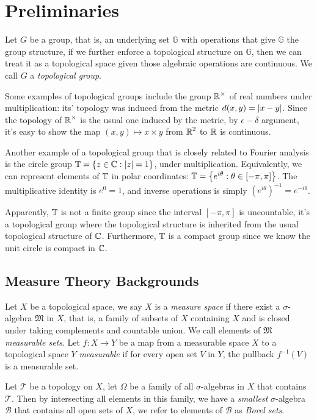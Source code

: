 \section{Preliminaries}

Let $G$ be a group, that is, an underlying set $\mathbb{G}$ with operations that
give $\mathbb{G}$ the group structure, if we further enforce a topological
structure on $\mathbb{G}$, then we can treat it as a topological space given
those algebraic operations are continuous. We call $G$ a \emph{topological group}.

Some examples of topological groups include the group $\operatorname{\mathbb{R}}^{\times}$ of real
numbers under multiplication: its' topology was induced from the metric $d(x,y)
= \left|x - y\right|$.  Since the topology of $\operatorname{\mathbb{R}}^{\times}$ is the usual one induced by
the metric, by $\epsilon-\delta$ argument, it's easy to show the map $(x,y)
\mapsto x \times y$ from $\operatorname{\mathbb{R}}^2$ to $\operatorname{\mathbb{R}}$ is continuous.

Another example of a topological group that is closely related to Fourier
analysis is the circle group $\operatorname{\mathbb{T}} = \left\{ z \in \operatorname{\mathbb{C}} : \left|z\right| = 1 \right\}$, under
multiplication.  Equivalently, we can represent elements of $\operatorname{\mathbb{T}}$ in polar
coordinates: $\operatorname{\mathbb{T}} = \left\{ e^{i\theta} : \theta \in [-\pi,\pi] \right\}$.  The
multiplicative identity is $e^{0} = 1$, and inverse operations is simply
$\left(e^{i\theta} \right)^{-1} = e^{-i\theta}$.

Apparently, $\operatorname{\mathbb{T}}$ is not a finite group since the interval $[-\pi, \pi]$ is
uncountable, it's a topological group where the topological structure is
inherited from the usual topological structure of $\operatorname{\mathbb{C}}$. Furthermore, $\operatorname{\mathbb{T}}$ is a
compact group since we know the unit circle is compact in $\operatorname{\mathbb{C}}$.

\subsection{Measure Theory Backgrounds}

Let $X$ be a topological space, we say $X$ is a \emph{measure space} if there
exist a $\sigma$-algebra $\mathfrak{M}$ in $X$, that is, a family of subsets of
$X$ containing $X$ and is closed under taking complements and countable union.
We call elements of $\mathfrak{M}$ \emph{measurable sets}. Let $f : X \to Y$ be
a map from a measurable space $X$ to a topological space $Y$ \emph{measurable}
if for every open set $V$ in $Y$, the pullback $f^{-1}(V)$ is a measurable set.

Let $\mathcal{T}$ be a topology on $X$, let $\Omega$ be a family of all
$\sigma$-algebras in $X$ that contains $\mathcal{T}$.  Then by intersecting all
elements in this family, we have a \emph{smallest} $\sigma$-algebra
$\mathcal{B}$ that contains all open sets of $X$, we refer to elements of
$\mathcal{B}$ as \emph{Borel sets}.

